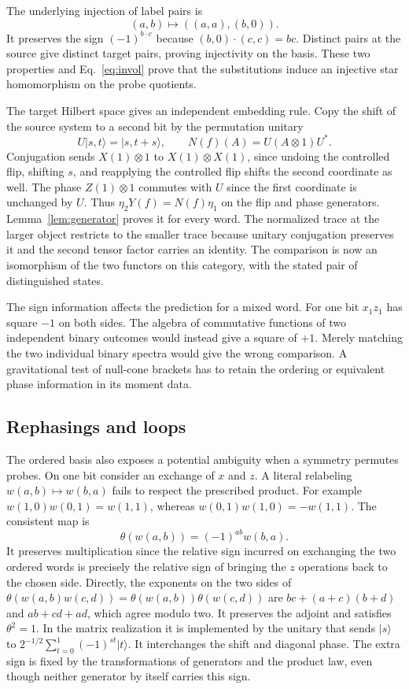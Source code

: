 \documentclass[11pt,letterpaper]{article}
\begin{document}
The underlying injection of label pairs is
\[
 (a,b)\longmapsto ((a,a),(b,0)).
\]
It preserves the sign $(-1)^{b\cdot c}$ because $(b,0)\cdot(c,c)=bc$. Distinct pairs at the source give distinct target pairs, proving injectivity on the basis. These two properties and Eq.~\eqref{eq:invol} prove that the substitutions induce an injective star homomorphism on the probe quotients.

The target Hilbert space gives an independent embedding rule. Copy the shift of the source system to a second bit by the permutation unitary
\[
 U|s,t\rangle=|s,t+s\rangle,\qquad
 N(f)(A)=U(A\otimes 1)U^* .
\]
Conjugation sends $X(1)\otimes1$ to $X(1)\otimes X(1)$, since undoing the controlled flip, shifting $s$, and reapplying the controlled flip shifts the second coordinate as well. The phase $Z(1)\otimes1$ commutes with $U$ since the first coordinate is unchanged by $U$. Thus $\eta_2Y(f)=N(f)\eta_1$ on the flip and phase generators. Lemma~\ref{lem:generator} proves it for every word. The normalized trace at the larger object restricts to the smaller trace because unitary conjugation preserves it and the second tensor factor carries an identity. The comparison is now an isomorphism of the two functors on this category, with the stated pair of distinguished states.

The sign information affects the prediction for a mixed word. For one bit $x_1z_1$ has square $-1$ on both sides. The algebra of commutative functions of two independent binary outcomes would instead give a square of $+1$. Merely matching the two individual binary spectra would give the wrong comparison. A gravitational test of null-cone brackets has to retain the ordering or equivalent phase information in its moment data.

\subsection{Rephasings and loops}

The ordered basis also exposes a potential ambiguity when a symmetry permutes probes. On one bit consider an exchange of $x$ and $z$. A literal relabeling $w(a,b)\mapsto w(b,a)$ fails to respect the prescribed product. For example $w(1,0)w(0,1)=w(1,1)$, whereas $w(0,1)w(1,0)=-w(1,1)$. The consistent map is
\[
 \theta(w(a,b))=(-1)^{ab} w(b,a).
\]
It preserves multiplication since the relative sign incurred on exchanging the two ordered words is precisely the relative sign of bringing the $z$ operations back to the chosen side. Directly, the exponents on the two sides of $\theta(w(a,b)w(c,d))=\theta(w(a,b))\theta(w(c,d))$ are $bc+(a+c)(b+d)$ and $ab+cd+ad$, which agree modulo two. It preserves the adjoint and satisfies $\theta^2=1$. In the matrix realization it is implemented by the unitary that sends $|s\rangle$ to $2^{-1/2}\sum_{t=0}^1(-1)^{st}|t\rangle$. It interchanges the shift and diagonal phase. The extra sign is fixed by the transformations of generators and the product law, even though neither generator by itself carries this sign.
\end{document}
